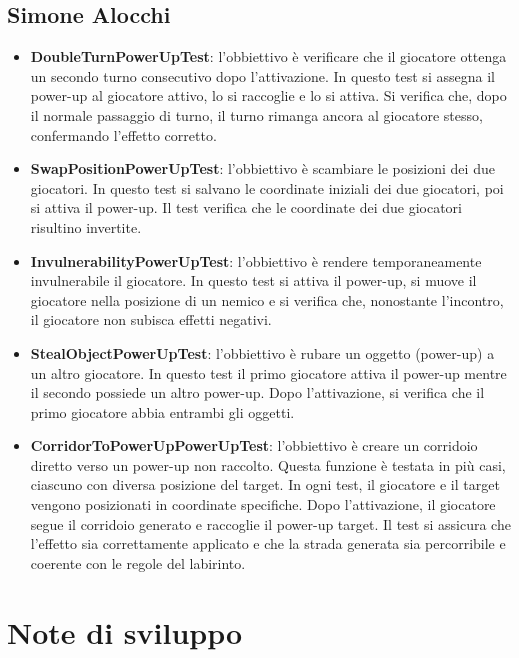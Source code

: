 \documentclass[a4paper,12pt]{report}
\begin{document}
\newpage
\subsection{Simone Alocchi}
\begin{itemize}
	\item \textbf{DoubleTurnPowerUpTest}: 
	l'obbiettivo è verificare che il giocatore ottenga un secondo turno consecutivo dopo l’attivazione.  
	In questo test si assegna il power-up al giocatore attivo, lo si raccoglie e lo si attiva.  
	Si verifica che, dopo il normale passaggio di turno, il turno rimanga ancora al giocatore stesso, confermando l’effetto corretto.
	\item \textbf{SwapPositionPowerUpTest}: 
	l'obbiettivo è scambiare le posizioni dei due giocatori.  
	In questo test si salvano le coordinate iniziali dei due giocatori, poi si attiva il power-up.  
	Il test verifica che le coordinate dei due giocatori risultino invertite.
	\item \textbf{InvulnerabilityPowerUpTest}:
	l'obbiettivo è rendere temporaneamente invulnerabile il giocatore.  
	In questo test si attiva il power-up, si muove il giocatore nella posizione di un nemico e si verifica che, 
	nonostante l’incontro, il giocatore non subisca effetti negativi.
	\item \textbf{StealObjectPowerUpTest}: 
	l'obbiettivo è rubare un oggetto (power-up) a un altro giocatore.  
	In questo test il primo giocatore attiva il power-up mentre il secondo possiede un altro power-up.  
	Dopo l’attivazione, si verifica che il primo giocatore abbia entrambi gli oggetti.
	\item \textbf{CorridorToPowerUpPowerUpTest}: 
	l'obbiettivo è creare un corridoio diretto verso un power-up non raccolto.  
	Questa funzione è testata in più casi, ciascuno con diversa posizione del target.
	In ogni test, il giocatore e il target vengono posizionati in coordinate specifiche.  
	Dopo l’attivazione, il giocatore segue il corridoio generato e raccoglie il power-up target.  
	Il test si assicura che l’effetto sia correttamente applicato e che la strada generata sia percorribile e coerente con le regole del labirinto.
\end{itemize}

\section{Note di sviluppo}
\end{document}

